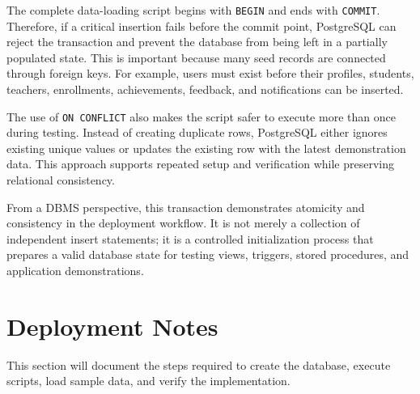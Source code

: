 The complete data-loading script begins with \texttt{BEGIN} and ends with \texttt{COMMIT}. Therefore, if a critical insertion fails before the commit point, PostgreSQL can reject the transaction and prevent the database from being left in a partially populated state. This is important because many seed records are connected through foreign keys. For example, users must exist before their profiles, students, teachers, enrollments, achievements, feedback, and notifications can be inserted.

The use of \texttt{ON CONFLICT} also makes the script safer to execute more than once during testing. Instead of creating duplicate rows, PostgreSQL either ignores existing unique values or updates the existing row with the latest demonstration data. This approach supports repeated setup and verification while preserving relational consistency.

From a DBMS perspective, this transaction demonstrates atomicity and consistency in the deployment workflow. It is not merely a collection of independent insert statements; it is a controlled initialization process that prepares a valid database state for testing views, triggers, stored procedures, and application demonstrations.

\section{Deployment Notes}
This section will document the steps required to create the database, execute scripts, load sample data, and verify the implementation.
